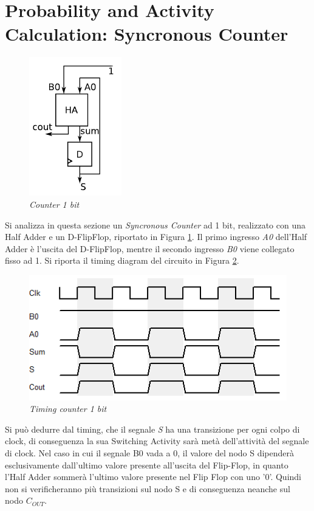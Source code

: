 \section{Probability and Activity Calculation: Syncronous Counter}
\begin{figure}[!htb]
	\centering
	\includegraphics[scale=0.6]{immagini/counter}
	\caption{\textit{Counter 1 bit}}
	\label{counter}
\end{figure}
\noindent Si analizza in questa sezione un \textit{Syncronous Counter} ad 1 bit, realizzato con una Half Adder e un D-FlipFlop, riportato in Figura \ref{counter}. Il primo ingresso \textit{A0} dell'Half Adder è l'uscita del D-FlipFlop, mentre il secondo ingresso \textit{B0} viene collegato fisso ad 1. Si riporta il timing diagram del circuito in Figura \ref{timing_counter1}.
\begin{figure}[!htb]
	\centering
	\includegraphics[scale=0.6]{immagini/timing_counter1}
	\caption{\textit{Timing counter 1 bit}}
	\label{timing_counter1}
\end{figure}
Si può dedurre dal timing, che il segnale \textit{S} ha una transizione per ogni colpo di clock, di conseguenza la sua Switching Activity sarà metà dell'attività del segnale di clock. Nel caso in cui il segnale B0 vada a 0, il valore del nodo S dipenderà esclusivamente dall'ultimo valore presente all'uscita del Flip-Flop, in quanto l'Half Adder sommerà l'ultimo valore presente nel Flip Flop con uno '0'. Quindi non si verificheranno più transizioni sul nodo S e di conseguenza neanche sul nodo $C_{OUT}$.

